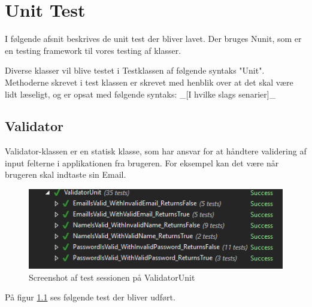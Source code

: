 \chapter{Unit Test}
I følgende afsnit beskrives de unit test der bliver lavet. Der bruges Nunit\cite{NUnit}, som er en testing framework til vores testing af klasser. 

Diverse klasser vil blive testet i Testklassen af følgende syntaks "Unit". Methoderne skrevet i test klassen er skrevet med henblik over at det skal være lidt læseligt, og er opsat med følgende syntaks: 
\_[I hvilke slags senarier]\_ 

\section{Validator}
Validator-klassen er en statisk klasse, som har ansvar for at håndtere validering af input felterne i applikationen fra brugeren. For eksempel kan det være når brugeren skal indtaste sin Email.
\begin{figure}[H]
	\centering
	\includegraphics[width=0.6\linewidth]{Unit/ValidatorUnit.PNG}
	\caption{Screenshot af test sessionen på ValidatorUnit}
	\label{fig:ValidatorUnit}
\end{figure}
På figur \ref{fig:ValidatorUnit} ses følgende test der bliver udført. 